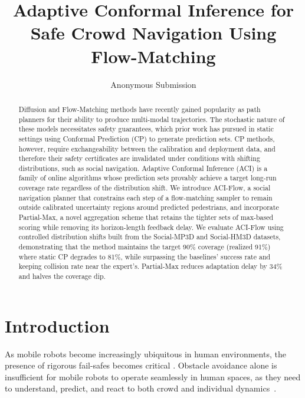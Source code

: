 \documentclass[letterpaper]{article} %
\title{Adaptive Conformal Inference for Safe Crowd Navigation Using Flow-Matching}
\author{
    Anonymous Submission
}
\begin{document}
\maketitle

\begin{abstract}
Diffusion and Flow-Matching methods have recently gained popularity as path planners for their ability to produce multi-modal trajectories. The stochastic nature of these models necessitates safety guarantees, which prior work has pursued in static settings using Conformal Prediction (CP) to generate prediction sets. CP methods, however, require exchangeability between the calibration and deployment data, and therefore their safety certificates are invalidated under conditions with shifting distributions, such as social navigation. Adaptive Conformal Inference (ACI) is a family of online algorithms whose prediction sets provably achieve a target long-run coverage rate regardless of the distribution shift. We introduce ACI-Flow, a social navigation planner that constrains each step of a flow-matching sampler to remain outside calibrated uncertainty regions around predicted pedestrians, and incorporate Partial-Max, a novel aggregation scheme that retains the tighter sets of max-based scoring while removing its horizon-length feedback delay. 
We evaluate ACI-Flow using controlled distribution shifts built from the Social-MP3D and Social-HM3D datasets, demonstrating that the method maintains the target 90\% coverage (realized 91\%) where static CP degrades to 81\%, while surpassing the baselines' success rate and keeping collision rate near the expert's. Partial-Max reduces adaptation delay by 34\% and halves the coverage dip.  
\end{abstract}

\begin{links}
\end{links}

\section{Introduction}

As mobile robots become increasingly ubiquitous in human environments, the presence of rigorous fail-safes becomes critical \cite{on_the_safety_of_mobile_robots}. Obstacle avoidance alone is insufficient for mobile robots to operate seamlessly in human spaces, as they need to understand, predict, and react to both crowd and individual dynamics~\cite{social_LSTM, gao_evaluation_2022}.
\end{document}
